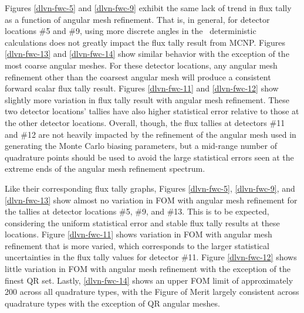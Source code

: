 Figures \ref{dlvn-fwc-5} and \ref{dlvn-fwc-9} exhibit the same lack of trend in flux tally as a
function of angular mesh refinement. That is, in general, for detector locations \#5 and \#9,
using more discrete angles in the \fwc\ deterministic calculations does not greatly impact the
flux tally result from MCNP. Figures \ref{dlvn-fwc-13} and \ref{dlvn-fwc-14} show similar
behavior with the exception of the most coarse angular meshes. For these detector locations, any
angular mesh refinement other than the coarsest angular mesh will produce a consistent forward 
scalar flux tally result. Figures \ref{dlvn-fwc-11} and \ref{dlvn-fwc-12} show slightly more
variation in flux tally result with angular mesh refinement. These two detector locations' 
tallies have also higher statistical error relative to those at the other detector locations. 
Overall, though, the flux tallies at detectors \#11 and \#12 are not heavily impacted by the
refinement of the angular mesh used in generating the Monte Carlo biasing parameters, but
a mid-range number of quadrature points should be used to avoid the large statistical
errors seen at the extreme ends of the angular mesh refinement spectrum.

Like their corresponding flux tally graphs, Figures \ref{dlvn-fwc-5}, \ref{dlvn-fwc-9}, and
\ref{dlvn-fwc-13} show almost no variation in FOM with angular mesh refinement for the tallies
at detector locations \#5, \#9, and \#13. This is to be expected, considering the uniform
statistical error and stable flux tally results at these locations. Figure \ref{dlvn-fwc-11}
shows variation in FOM with angular mesh refinement that is more varied, which corresponds to
the larger statistical uncertainties in the flux tally values for detector \#11. Figure
\ref{dlvn-fwc-12} shows little variation in FOM with angular mesh refinement with the 
exception of the finest QR set. Lastly, \ref{dlvn-fwc-14} shows an upper FOM limit of 
approximately 200 across all quadrature types, with the Figure of Merit largely consistent
across quadrature types with the exception of QR angular meshes.

